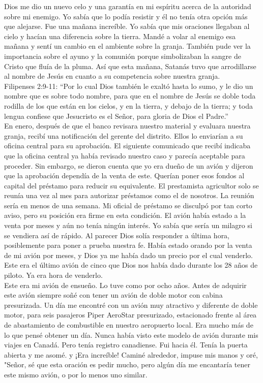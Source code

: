 \documentclass[twoside, 12pt]{book}
\begin{document}
Dios me dio un nuevo celo y una garantía en mi espíritu acerca de la autoridad sobre mi enemigo. Yo sabía que lo podía resistir y él no tenía otra opción más que alejarse. Fue una mañana increíble. Yo sabía que mis oraciones llegaban al cielo y hacían una diferencia sobre la tierra. Mandé a volar al enemigo esa mañana y sentí un cambio en el ambiente sobre la granja. También pude ver la importancia sobre el ayuno y la comunión porque simbolizaban la sangre de Cristo que fluía de la pluma. Así que esta mañana, Satanás tuvo que arrodillarse al nombre de Jesús en cuanto a su competencia sobre nuestra granja.\\

Filipenses 2:9-11: “Por lo cual Dios también le exaltó hasta lo sumo, y le dio un nombre que es sobre todo nombre, para que en el nombre de Jesús se doble toda rodilla de los que están en los cielos, y en la tierra, y debajo de la tierra; y toda lengua confiese que Jesucristo es el Señor, para gloria de Dios el Padre.”\\

En enero, después de que el banco revisara nuestro material y evaluara nuestra granja, recibí una notificación del gerente del distrito. Ellos lo enviarían a su oficina central para su aprobación. El siguiente comunicado que recibí indicaba que la oficina central ya había revisado nuestro caso y parecía aceptable para proceder. Sin embargo, se dieron cuenta que yo era dueño de un avión y dijeron que la aprobación dependía de la venta de este. Querían poner esos fondos al capital del préstamo para reducir su equivalente. El prestamista agricultor solo se reunía una vez al mes para autorizar préstamos como el de nosotros. La reunión sería en menos de una semana. Mi oficial de préstamo se disculpó por tan corto aviso, pero su posición era firme en esta condición. El avión había estado a la venta por meses y aún no tenía ningún interés. Yo sabía que sería un milagro si se vendiera así de rápido. Al parecer Dios solía responder a última hora, posiblemente para poner a prueba nuestra fe. Había estado orando por la venta de mi avión por meses, y Dios ya me había dado un precio por el cual venderlo. Este era el último avión de cinco que Dios nos había dado durante los 28 años de piloto. Ya era hora de venderlo.\\

Este era mi avión de ensueño. Lo tuve como por ocho años. Antes de adquirir este avión siempre soñé con tener un avión de doble motor con cabina presurizada. Un día me encontré con un avión muy atractivo y diferente de doble motor, para seis pasajeros Piper AeroStar presurizado, estacionado frente al área de abastamiento de combustible en nuestro aeropuerto local. Era mucho más de lo que pensé obtener un día. Nunca había visto este modelo de avión durante mis viajes en Canadá. Pero tenía registro canadiense. Fui hacia él. Tenía la puerta abierta y me asomé. y ¡Era increíble! Caminé alrededor, impuse mis manos y oré, "Señor, sé que esta oración es pedir mucho, pero algún día me encantaría tener este mismo avión, o por lo menos uno similar.\\
\end{document}
